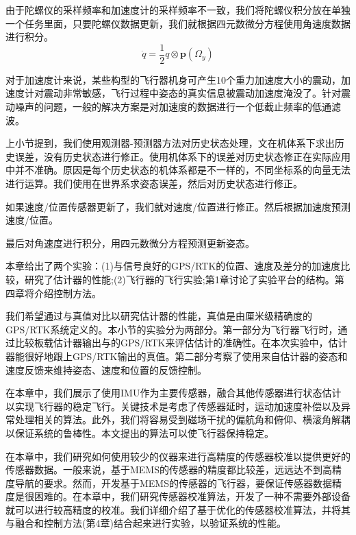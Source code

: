 \documentclass[
  type=master
]{gdutthesis}
\begin{document}
由于陀螺仪的采样频率和加速度计的采样频率不一致，我们将陀螺仪积分放在单独一个任务里面，只要陀螺仪数据更新，我们就根据四元数微分方程使用角速度数据进行积分。
\begin{equation}\label{eq:quatint}
		\dot{q}=\frac{1}{2} q \otimes \mathbf{p}(\Omega_y)
\end{equation}

对于加速度计来说，某些构型的飞行器机身可产生10个重力加速度大小的震动，加速度计对震动非常敏感，飞行过程中姿态的真实信息被震动加速度淹没了。针对震动噪声的问题，一般的解决方案是对加速度的数据进行一个低截止频率的低通滤波。

上小节提到，我们使用观测器-预测器方法对历史状态处理，文\cite{khosravian2014velocity}在机体系下求出历史误差，没有历史状态进行修正。使用机体系下的误差对历史状态修正在实际应用中并不准确。原因是每个历史状态的机体系都是不一样的，不同坐标系的向量无法进行运算。我们使用在世界系求姿态误差，然后对历史状态进行修正。

如果速度/位置传感器更新了，我们就对速度/位置进行修正。然后根据加速度预测速度/位置。

最后对角速度进行积分，用四元数微分方程预测更新姿态。

本章给出了两个实验：(1)与信号良好的GPS/RTK的位置、速度及差分的加速度比较，研究了估计器的性能;(2)飞行器的飞行实验;第1章讨论了实验平台的结构。第四章将介绍控制方法。

我们希望通过与真值对比以研究估计器的性能，真值是由厘米级精确度的GPS/RTK系统定义的。本小节的实验分为两部分。第一部分为飞行器飞行时，通过比较板载估计器输出与的GPS/RTK来评估估计的准确性。在本次实验中，估计器能很好地跟上GPS/RTK输出的真值。第二部分考察了使用来自估计器的姿态和速度反馈来维持姿态、速度和位置的反馈控制。


在本章中，我们展示了使用IMU作为主要传感器，融合其他传感器进行状态估计以实现飞行器的稳定飞行。关键技术是考虑了传感器延时，运动加速度补偿以及异常处理相关的算法。此外，我们将容易受到磁场干扰的偏航角和俯仰、横滚角解耦以保证系统的鲁棒性。本文提出的算法可以使飞行器保持稳定。

在本章中，我们研究如何使用较少的仪器来进行高精度的传感器校准以提供更好的传感器数据。一般来说，基于MEMS的传感器的精度都比较差，远远达不到高精度导航的要求。然而，开发基于MEMS的传感器的飞行器，要保证传感器数据精度是很困难的。在本章中，我们研究传感器校准算法，开发了一种不需要外部设备就可以进行较高精度的校准。我们详细介绍了基于优化的传感器校准算法，并将其与融合和控制方法(第4章)结合起来进行实验，以验证系统的性能。
\end{document}
